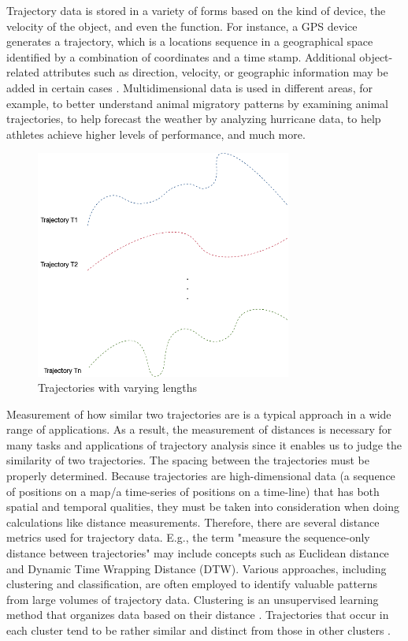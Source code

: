 \documentclass[a4paper, 12pt]{article}
\begin{document}
Trajectory data is stored in a variety of forms based on the kind of device, the velocity of the object, and even the function. For instance, a GPS device generates a trajectory, which is a locations sequence in a geographical space identified by a combination of coordinates and a time stamp. Additional object-related attributes such as direction, velocity, or geographic information may be added in certain cases \citep{ying2011semantic, ying2010mining}. Multidimensional data is used in different areas, for example, to better understand animal migratory patterns by examining animal trajectories, to help forecast the weather by analyzing hurricane data, to help athletes achieve higher levels of performance, and much more.  

\begin{figure}[ht]
    \centering
    \includegraphics[width=0.75\textwidth]{Trajectories.png}
    \caption{Trajectories with varying lengths}
    \label{fig1}
\end{figure}

Measurement of how similar two trajectories are is a typical approach in a wide range of applications. As a result, the measurement of distances is necessary for many tasks and applications of trajectory analysis since it enables us to judge the similarity of two trajectories. The spacing between the trajectories must be properly determined. Because trajectories are high-dimensional data (a sequence of positions on a map/a time-series of positions on a time-line) that has both spatial and temporal qualities, they must be taken into consideration when doing calculations like distance measurements. Therefore, there are several distance metrics used for trajectory data. E.g., the term "measure the sequence-only distance between trajectories" may include concepts such as Euclidean distance and Dynamic Time Wrapping Distance (DTW). Various approaches, including clustering and classification, are often employed to identify valuable patterns from large volumes of trajectory data. Clustering is an unsupervised learning method that organizes data based on their distance \citep{han2011data,xu2005survey}. Trajectories that occur in each cluster tend to be rather similar and distinct from those in other clusters \citep{berkhin2006survey,besse2015review, yuan2017review}.
\end{document}
